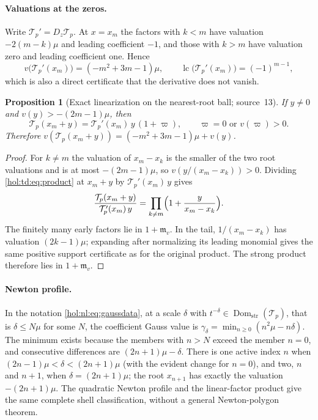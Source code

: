 \documentclass[11pt]{article}
\numberwithin{equation}{section}
\newtheorem{proposition}[theorem]{Proposition}
\theoremstyle{definition}
\theoremstyle{remark}
\newcommand{\lc}{\operatorname{lc}}
\newcommand{\Dom}{\operatorname{Dom}_{\mathrm{str}}}
\begin{document}
\paragraph{Valuations at the zeros.}
Write $\mathcal T_p'=D_z\mathcal T_p$. At $x=x_m$ the factors with $k<m$ have
valuation $-2(m-k)\mu$ and leading coefficient $-1$, and those with $k>m$ have
valuation zero and leading coefficient one. Hence
\begin{equation}\label{hol:td:eq:rootderivative}
 v\bigl(\mathcal T_p'(x_m)\bigr)=(-m^2+3m-1)\mu,\qquad
 \lc\bigl(\mathcal T_p'(x_m)\bigr)=(-1)^{m-1},
\end{equation}
which is also a direct certificate that the derivative does not vanish.

\begin{proposition}[Exact linearization on the nearest-root ball; source~13]
\label{hol:td:prop:local}
If $y\ne0$ and $v(y)>-(2m-1)\mu$, then
\begin{equation}\label{hol:td:eq:linearization}
 \mathcal T_p(x_m+y)=\mathcal T_p'(x_m)\,y\,(1+\varpi),\qquad
 \varpi=0\text{ or }v(\varpi)>0.
\end{equation}
Therefore $v(\mathcal T_p(x_m+y))=(-m^2+3m-1)\mu+v(y)$.
\end{proposition}

\begin{proof}
For $k\ne m$ the valuation of $x_m-x_k$ is the smaller of the two root
valuations and is at most $-(2m-1)\mu$, so $v(y/(x_m-x_k))>0$. Dividing
\eqref{hol:td:eq:product} at $x_m+y$ by $\mathcal T_p'(x_m)\,y$ gives
\[
 \frac{\mathcal T_p(x_m+y)}{\mathcal T_p'(x_m)\,y}
 =\prod_{k\ne m}\Bigl(1+\frac y{x_m-x_k}\Bigr).
\]
The finitely many early factors lie in $1+\mathfrak m_v$. In the tail,
$1/(x_m-x_k)$ has valuation $(2k-1)\mu$; expanding after normalizing its
leading monomial gives the same positive support certificate as for the
original product. The strong product therefore lies in $1+\mathfrak m_v$.
\end{proof}

\paragraph{Newton profile.}
In the notation \eqref{hol:nl:eq:gaussdata}, at a scale $\delta$ with
$t^{-\delta}\in\Dom(\mathcal T_p)$, that is $\delta\le N\mu$ for some $N$, the
coefficient Gauss value is
$\gamma_\delta=\min_{n\ge0}(n^2\mu-n\delta)$. The minimum exists because the
members with $n>N$ exceed the member $n=0$, and consecutive differences are
$(2n+1)\mu-\delta$. There is one active index $n$ when
$(2n-1)\mu<\delta<(2n+1)\mu$ (with the evident change for $n=0$), and two, $n$
and $n+1$, when $\delta=(2n+1)\mu$; the root $x_{n+1}$ has exactly the valuation
$-(2n+1)\mu$. The quadratic Newton profile and the linear-factor product give
the same complete shell classification, without a general Newton-polygon
theorem.
\end{document}
